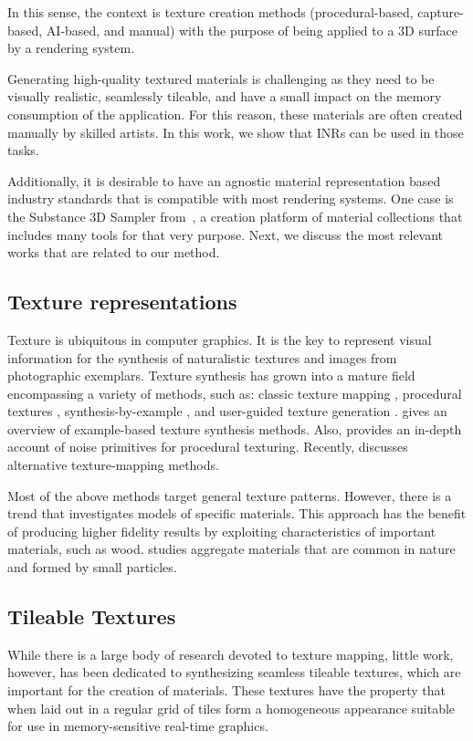 In this sense, the context is texture creation methods (procedural-based, capture-based, AI-based, and manual) with the purpose of being applied to a 3D surface by a rendering system.

Generating high-quality textured materials is challenging as they need to be visually realistic, seamlessly tileable, and have a small impact on the memory consumption of the application. For this reason, these materials are often created manually by skilled artists.
In this work, we show that INRs can be used in those tasks.

Additionally, it is desirable to have an agnostic material representation based industry standards that is compatible with most rendering systems. One case is the Substance 3D Sampler from~\citet{substance_sampler}, a creation platform of material collections that includes many tools for that very purpose. 
Next, we discuss the most relevant works that are related to our method.


\subsection{Texture representations}

Texture is ubiquitous in computer graphics. It is the key to represent visual information for the synthesis of naturalistic textures and images from photographic exemplars. Texture synthesis has grown into a mature field encompassing a variety of methods, such as: classic texture mapping \cite{blinn76}, procedural textures \cite{perlin-1985}, synthesis-by-example \cite{efros99}, and user-guided texture generation \cite{haeberli90}. \citet{pauly-2009} gives an overview of example-based texture synthesis methods. Also, \citet{etal-2010} provides an in-depth account of noise primitives for procedural texturing.
%
Recently, \citet{rethinkngtex} discusses alternative texture-mapping methods.

Most of the above methods target general texture patterns. However, there is a trend that investigates models of specific materials. This approach has the benefit of producing higher fidelity results by exploiting characteristics of important materials, such as wood.
\citet{dorsey-2004} studies aggregate materials that are common in nature and formed by small particles.

\subsection{Tileable Textures}
While there is a large body of research devoted to texture mapping, little work, however,  has been dedicated to synthesizing seamless tileable textures, which are important for the creation of materials. These textures have the property that when laid out in a regular grid of tiles form a homogeneous appearance suitable for use in memory-sensitive real-time graphics.

